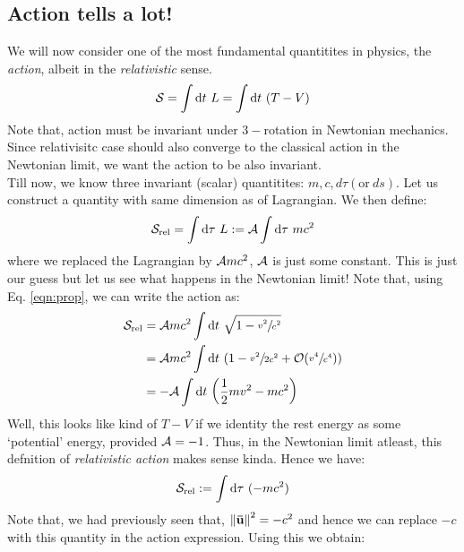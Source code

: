 \subsection{Action tells a lot!}
We will now consider one of the most fundamental quantitites in physics, the \textit{action}, albeit in the \textit{relativistic} sense.
$$\Ss = \int \dd t\ L = \int \dd t \ (T-V)$$ Note that, action must be invariant under $\mathfrak{3}-$rotation in Newtonian mechanics. Since relativisitc case should also converge to the classical action in the Newtonian limit, we want the action to be also invariant. \\[0.2cm]
Till now, we know three invariant (scalar) quantitites: $m, c, d\tau (\mathrm{or\ } ds)$. Let us construct a quantity with same dimension as of Lagrangian. We then define:
$$\mathcal S_{\mathrm{rel}} = \int \dd\tau\  L := \mathcal A\int \dd\tau \ mc^2$$
where we replaced the Lagrangian by $\mathcal A mc^2$, $\mathcal A$ is just some constant. This is just our guess but let us see what happens in the Newtonian limit! Note that, using Eq. \ref{eqn:prop}, we can write the action as:
\begin{align*}
    \mathcal S_{\mathrm{rel}} &= \mathcal A mc^2 \int \dd t \ \sqrt{1- \sfrac{v^2}{c^2}}\\
    &=\mathcal A mc^2\int \dd t \ \qty(1 - \sfrac{v^2}{2c^2}+\mathcal O(\sfrac{v^4}{c^4}))\\
    &=-\mathcal A \int \dd t\ \qty(\frac{1}{2}mv^2 - mc^2)
\end{align*}
Well, this looks like kind of $T-V$ if we identity the rest energy as some `potential' energy, provided $\mathcal A=-1$. Thus, in the Newtonian limit atleast, this defnition of \textit{relativistic action} makes sense kinda. Hence we have:
\begin{equation}\label{eqn:action}
    \mathcal S_{\mathrm{rel}} := \int \dd \tau \ (-mc^2)
\end{equation}
Note that, we had previously seen that, $\norm{\vb{\bar{u}}}^2 = -c^2$ and hence we can replace $-c$ with this quantity in the action expression. Using this we obtain:

